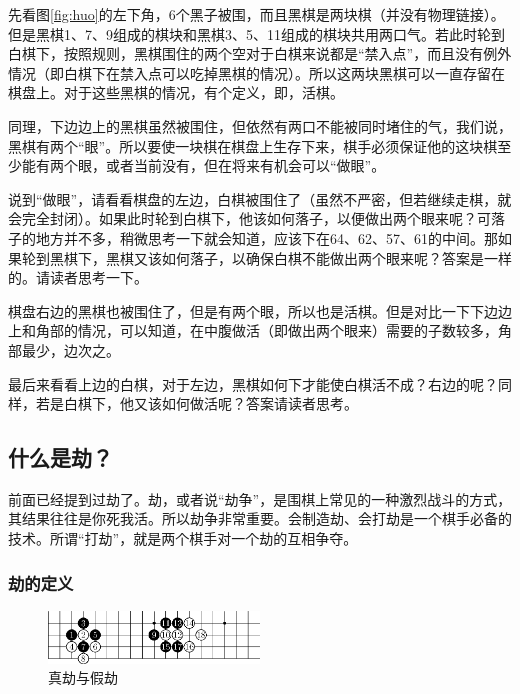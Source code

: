 \documentclass[12pt，a4paper, titlepage]{article}
\begin{document}
先看图\ref{fig:huo}的左下角，6个黑子被围，而且黑棋是两块棋（并没有物理链接）。但是黑棋1、7、9组成的棋块和黑棋3、5、11组成的棋块共用两口气。若此时轮到白棋下，按照规则，黑棋围住的两个空对于白棋来说都是“禁入点”，而且没有例外情况（即白棋下在禁入点可以吃掉黑棋的情况）。所以这两块黑棋可以一直存留在棋盘上。对于这些黑棋的情况，有个定义，即，活棋。

同理，下边边上的黑棋虽然被围住，但依然有两口不能被同时堵住的气，我们说，黑棋有两个“眼”。所以要使一块棋在棋盘上生存下来，棋手必须保证他的这块棋至少能有两个眼，或者当前没有，但在将来有机会可以“做眼”。

说到“做眼”，请看看棋盘的左边，白棋被围住了（虽然不严密，但若继续走棋，就会完全封闭）。如果此时轮到白棋下，他该如何落子，以便做出两个眼来呢？可落子的地方并不多，稍微思考一下就会知道，应该下在64、62、57、61的中间。那如果轮到黑棋下，黑棋又该如何落子，以确保白棋不能做出两个眼来呢？答案是一样的。请读者思考一下。

棋盘右边的黑棋也被围住了，但是有两个眼，所以也是活棋。但是对比一下下边边上和角部的情况，可以知道，在中腹做活（即做出两个眼来）需要的子数较多，角部最少，边次之。

最后来看看上边的白棋，对于左边，黑棋如何下才能使白棋活不成？右边的呢？同样，若是白棋下，他又该如何做活呢？答案请读者思考。

\subsection{什么是劫？}
前面已经提到过劫了。劫，或者说“劫争”，是围棋上常见的一种激烈战斗的方式，其结果往往是你死我活。所以劫争非常重要。会制造劫、会打劫是一个棋手必备的技术。所谓“打劫”，就是两个棋手对一个劫的互相争夺。

\subsubsection{劫的定义}
\begin{figure}[htbp]   %
	\setlength{\abovecaptionskip}{4pt}    
	\setlength{\belowcaptionskip}{4pt}
	\centering  %
	\includegraphics[width=0.5\textwidth]{fig/jie01.eps}
	\caption{真劫与假劫}
	\label{fig:jie01}
\end{figure}
\end{document}
